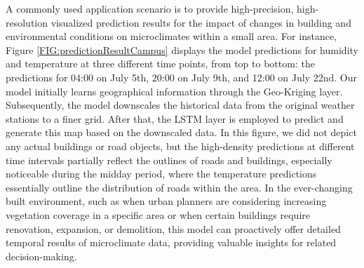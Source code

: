 \documentclass[a4paper,fleqn]{cas-sc}
\begin{document}
A commonly used application scenario is to provide high-precision, high-resolution visualized prediction results for the impact of changes in building and environmental conditions on microclimates within a small area. For instance, Figure \ref{FIG:predictionResultCampus} displays the model predictions for humidity and temperature at three different time points, from top to bottom: the predictions for 04:00 on July 5th, 20:00 on July 9th, and 12:00 on July 22nd. Our model initially learns geographical information through the Geo-Kriging layer. Subsequently, the model downscales the historical data from the original weather stations to a finer grid. After that, the LSTM layer is employed to predict and generate this map based on the downscaled data. In this figure, we did not depict any actual buildings or road objects, but the high-density predictions at different time intervals partially reflect the outlines of roads and buildings, especially noticeable during the midday period, where the temperature predictions essentially outline the distribution of roads within the area. In the ever-changing built environment, such as when urban planners are considering increasing vegetation coverage in a specific area or when certain buildings require renovation, expansion, or demolition, this model can proactively offer detailed temporal results of microclimate data, providing valuable insights for related decision-making.
\end{document}
